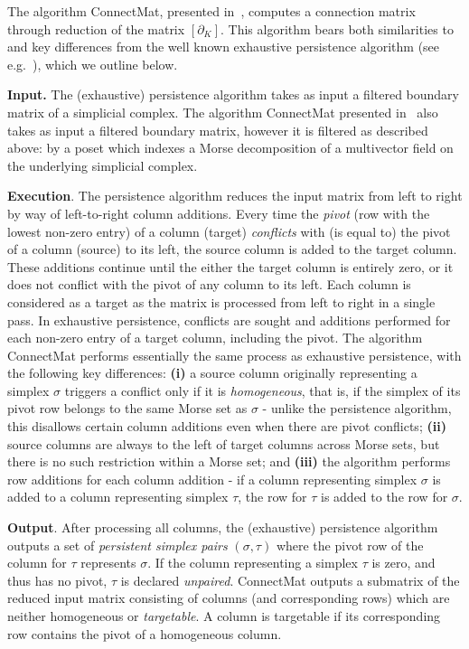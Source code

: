 \documentclass[a4paper,english,cleveref]{article}
\theoremstyle{plain}
\newcounter{li}
\begin{document}
The algorithm {\sc ConnectMat}, presented in~\cite{DLMS24}, computes a connection matrix through reduction of the matrix $[\partial_K]$. This algorithm bears both similarities to and key differences from the well known exhaustive persistence algorithm (see e.g.~\cite{EH2010}), which we outline below.

\textbf{Input.} The (exhaustive) persistence algorithm takes as input a filtered boundary matrix of a simplicial complex. The algorithm {\sc ConnectMat} presented in~\cite{DLMS24} also takes as input a filtered boundary matrix, however it is filtered as described above: by a poset which indexes a Morse decomposition of a multivector field on the underlying simplicial complex.


\textbf{Execution}. The persistence algorithm reduces the input matrix from left to right by way of left-to-right column additions. Every time the \emph{pivot} (row with the lowest non-zero entry) of a column (target) \emph{conflicts} with (is equal to) the pivot of a column (source) to its left, the source column is added to the target column. These additions continue until the either the target column is entirely zero, or it does not conflict with the pivot of any column to its left. Each column is considered as a target as the matrix is processed from left to right in a single pass. In exhaustive persistence, conflicts are sought and additions performed for each non-zero entry of a target column, including the pivot. The algorithm {\sc ConnectMat} performs essentially the same process as exhaustive persistence, with the following key differences: \textbf{(i)} a source column originally representing a simplex $\sigma$ triggers a conflict only if it is \textit{homogeneous}, that is, if the simplex of its pivot row belongs to the same Morse set as $\sigma$ - unlike the persistence algorithm, this disallows certain
column additions even when there are pivot conflicts; \textbf{(ii)} source columns are always to the left of target columns across Morse sets, but there is no such restriction within a Morse set; and \textbf{(iii)} the algorithm performs row additions for each column addition - if a column representing simplex $\sigma$ is added to a column representing simplex $\tau$, the row for $\tau$ is added to the row for $\sigma$.

\textbf{Output}. After processing all columns, the (exhaustive) persistence algorithm outputs a set of \textit{persistent simplex pairs} $(\sigma,\tau)$ where the pivot row of the column for $\tau$ represents $\sigma$. If the column representing a simplex $\tau$ is zero, and thus has no pivot, $\tau$ is declared \textit{unpaired}. {\sc ConnectMat} outputs a submatrix of the reduced input matrix consisting of columns (and corresponding rows) which are neither homogeneous or \textit{targetable}. A column is targetable if its corresponding row contains the pivot of a homogeneous column.
\end{document}
